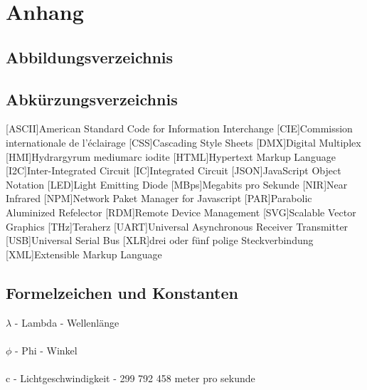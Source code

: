 \documentclass[11pt]{scrartcl}
\begin{document}
\section*{Anhang}

\subsection{Abbildungsverzeichnis}
\begingroup
\renewcommand{\section}[2]{}
\listoffigures
\endgroup
\clearpage

\subsection{Abkürzungsverzeichnis}
\begin{acronym}
    [ASCII]{American Standard Code for Information Interchange}
    [CIE]{Commission internationale de l’éclairage}
    [CSS]{Cascading Style Sheets}
    [DMX]{Digital Multiplex}
    [HMI]{Hydrargyrum mediumarc iodite}
    [HTML]{Hypertext Markup Language}
    [I2C]{Inter-Integrated Circuit}
    [IC]{Integrated Circuit}
    [JSON]{JavaScript Object Notation}
    [LED]{Light Emitting Diode}
    [MBps]{Megabits pro Sekunde}
    [NIR]{Near Infrared}
    [NPM]{Network Paket Manager for Javascript}
    [PAR]{Parabolic Aluminized Refelector}
    [RDM]{Remote Device Management}
    [SVG]{Scalable Vector Graphics}
    [THz]{Teraherz}
    [UART]{Universal Asynchronous Receiver Transmitter}
    [USB]{Universal Serial Bus}
    [XLR]{drei oder fünf polige Steckverbindung}
    [XML]{Extensible Markup Language}
\end{acronym}
\clearpage

\subsection{Formelzeichen und Konstanten}
$\lambda$ - Lambda - Wellenlänge\\
\\
$\phi$ - Phi - Winkel\\
\\
c - Lichtgeschwindigkeit - 299 792 458 meter pro sekunde
\clearpage
\end{document}
